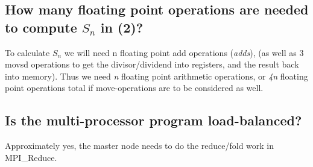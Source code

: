 \subsection{How many floating point operations are needed to compute $S_n$ in (2)?}
To calculate $S_n$ we will need n floating point add operations (\textit{adds}), (as well as 3 movsd operations to get the divisor/dividend
into registers, and the result back into memory). Thus we need \textit{n} floating point arithmetic operations, or \textit{4n} floating point
operations total if move-operations are to be considered as well.

\subsection{Is the multi-processor program load-balanced?}
Approximately yes, the master node needs to do the reduce/fold work in MPI\_Reduce.
